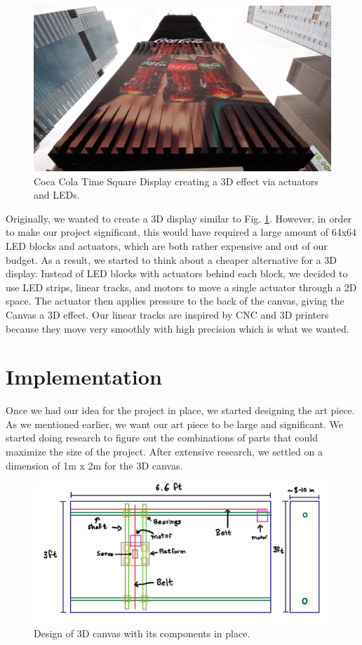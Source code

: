 \documentclass[11pt]{IEEEtran}
\begin{document}
\begin{figure}[tb]
  \centering
  \includegraphics[width=\textwidth]{image1.png}
  \caption{Coca Cola Time Square Display creating a 3D effect via actuators and LEDs.}
  \label{fig:cocacola}
\end{figure}

Originally, we wanted to create a 3D display similar to Fig. \ref{fig:cocacola}. However, in order to make our project significant, this would have required a large amount of 64x64 LED blocks and actuators, which are both rather expensive and out of our budget. As a result, we started to think about a cheaper alternative for a 3D display. Instead of LED blocks with actuators behind each block, we decided to use LED strips, linear tracks, and motors to move a single actuator through a 2D space. The actuator then applies pressure to the back of the canvas, giving the Canvas a 3D effect. Our linear tracks are inspired by CNC and 3D printers because they move very smoothly with high precision which is what we wanted.

\section{Implementation}
Once we had our idea for the project in place, we started designing the art piece. As we mentioned earlier, we want our art piece to be large and significant. We started doing research to figure out the combinations of parts that could maximize the size of the project. After extensive research, we settled on a dimension of 1m x 2m for the 3D canvas.

\begin{figure}[H]
  \centering
  \includegraphics[width=\columnwidth]{image4.png}
  \caption{Design of 3D canvas with its components in place.}
  \label{fig:design}
\end{figure}
\end{document}
